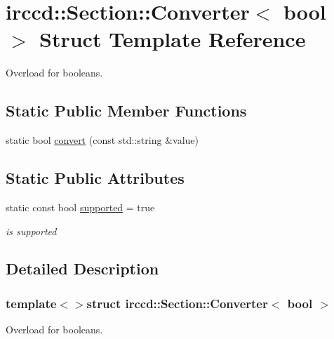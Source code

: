 \hypertarget{a00018}{\section{irccd\-:\-:Section\-:\-:Converter$<$ bool $>$ Struct Template Reference}
\label{a00018}
}


Overload for booleans.  


\subsection*{Static Public Member Functions}
\begin{DoxyCompactItemize}
\item 
static bool \hyperlink{a00018_a7c13737c69f5e09db580d58a53db64a7}{convert} (const std\-::string \&value)
\end{DoxyCompactItemize}
\subsection*{Static Public Attributes}
\begin{DoxyCompactItemize}
\item 
\hypertarget{a00018_a6bf7a897a52f8f8041459ca6f5b29a17}{static const bool \hyperlink{a00018_a6bf7a897a52f8f8041459ca6f5b29a17}{supported} = true}\label{a00018_a6bf7a897a52f8f8041459ca6f5b29a17}

\begin{DoxyCompactList}\small\item\em is supported \end{DoxyCompactList}\end{DoxyCompactItemize}


\subsection{Detailed Description}
\subsubsection*{template$<$$>$struct irccd\-::\-Section\-::\-Converter$<$ bool $>$}

Overload for booleans. 

